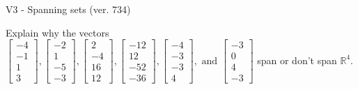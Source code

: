 \begin{exercise}
  \begin{exerciseTitle}V3 - Spanning sets (ver. 734)\end{exerciseTitle}
  \begin{exerciseStatement}
    Explain why the vectors \(\left[\begin{array}{r}
-4 \\
-1 \\
1 \\
3
\end{array}\right] , \left[\begin{array}{r}
-2 \\
1 \\
-5 \\
-3
\end{array}\right] , \left[\begin{array}{r}
2 \\
-4 \\
16 \\
12
\end{array}\right] , \left[\begin{array}{r}
-12 \\
12 \\
-52 \\
-36
\end{array}\right] , \left[\begin{array}{r}
-4 \\
-3 \\
-3 \\
4
\end{array}\right] , \text{ and } \left[\begin{array}{r}
-3 \\
0 \\
4 \\
-3
\end{array}\right]\) span or don't span \(\mathbb{R}^4\). 
	



\end{exerciseStatement}
\end{exercise}
